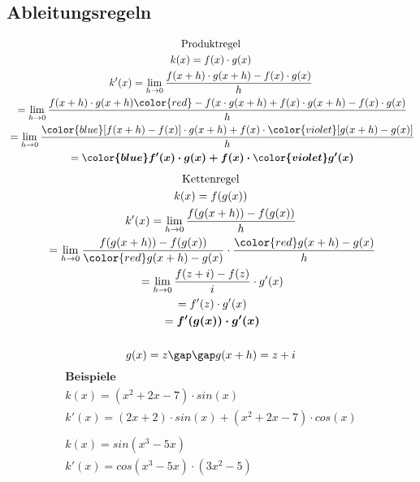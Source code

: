 \subsection{Ableitungsregeln}
\begin{gather*}
  \text{Produktregel} \\
  k(x) = f(x) \cdot g(x) \\
  k'(x) = \lim\limits_{h \to 0} \frac{f(x + h) \cdot g(x + h) - f(x) \cdot g(x)}{h} \\
  \;= \lim\limits_{h \to 0} \frac{f(x + h) \cdot g(x + h) {\color{red}- f(x \cdot g(x + h) + f(x) \cdot g(x + h)} - f(x) \cdot g(x)}{h} \\
  \;= \lim\limits_{h \to 0} \frac{{\color{blue}[f(x + h) - f(x)]} \cdot g(x + h) + f(x) \cdot {\color{violet}[g(x + h) - g(x)]}}{h} \\
  \;= \boldsymbol{{\color{blue}f'(x)} \cdot g(x) + f(x) \cdot {\color{violet}g'(x)}}
\end{gather*}
\begin{gather*}
  \text{Kettenregel} \\
  k(x) = f(g(x)) \\
  k'(x) = \lim\limits_{h \to 0} \frac{f(g(x + h)) - f(g(x))}{h} \\
  \;= \lim\limits_{h \to 0} \frac{f(g(x + h)) - f(g(x))}{{\color{red}g(x + h) - g(x)}} \cdot \frac{{\color{red}g(x + h) - g(x)}}{h} \\
  \;= \lim\limits_{h \to 0} \frac{f(z + i) - f(z)}{i} \cdot g'(x) \\
  \;= f'(z) \cdot g'(x) \\
  \;= \boldsymbol{f'(g(x)) \cdot g'(x)} \\\\
  g(x) = z \gap\gap g(x + h) = z + i
\end{gather*}
\begin{gather*}
  \textbf{Beispiele} \\
  k(x) = (x^2 + 2x - 7) \cdot sin(x) \\
  k'(x) = (2x + 2) \cdot sin(x) + (x^2 + 2x - 7) \cdot cos(x) \\\\
  k(x) = sin(x^3 - 5x) \\
  k'(x) = cos(x^3 - 5x) \cdot (3x^2 - 5)
\end{gather*}
